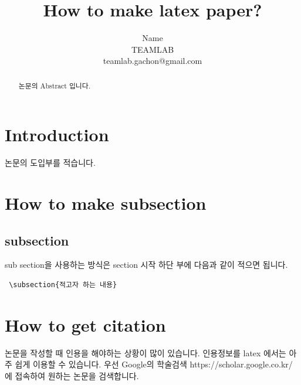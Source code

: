 \documentclass[twocolumn, 10pt]{article}
\begin{document}
\begin{CJK}{UTF8}{}
\title{How to make latex paper?}
\author{Name \\
        TEAMLAB \\
        teamlab.gachon@gmail.com\\}

\date{}  

\maketitle   

\begin{abstract}
논문의 Abstract 입니다. 
\end{abstract}


\section{Introduction}
논문의 도입부를 적습니다. 

\section{How to make subsection}
\subsection{subsection}
sub section을 사용하는 방식은 section 시작 하단 부에 다음과 같이 적으면 됩니다.
\begin{verbatim}
 \subsection{적고자 하는 내용}    
\end{verbatim}


\section{How to get citation}
논문을 작성할 때 인용을 해야하는 상황이 많이 있습니다. 인용정보를 latex 에서는 아주 쉽게 이용할 수 있습니다. 
우선 Google의 학술검색 https://scholar.google.co.kr/ 에 접속하여 원하는 논문을 검색합니다. 


\end{CJK}
\end{document}
